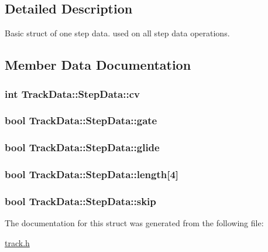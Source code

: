\subsection{Detailed Description}
Basic struct of one step data. used on all step data operations. 

\subsection{Member Data Documentation}
\hypertarget{structTrackData_1_1StepData_a67ecaedf95ce95b8a92ecf1990644214}{
\subsubsection[{cv}]{\setlength{\rightskip}{0pt plus 5cm}int Track\-Data\-::\-Step\-Data\-::cv}}\label{structTrackData_1_1StepData_a67ecaedf95ce95b8a92ecf1990644214}
\hypertarget{structTrackData_1_1StepData_a3d44ed4a2b85f2c8c73687b4c1c07b1d}{
\subsubsection[{gate}]{\setlength{\rightskip}{0pt plus 5cm}bool Track\-Data\-::\-Step\-Data\-::gate}}\label{structTrackData_1_1StepData_a3d44ed4a2b85f2c8c73687b4c1c07b1d}
\hypertarget{structTrackData_1_1StepData_a463a1c0acf02277e2fcb9019adf280d3}{
\subsubsection[{glide}]{\setlength{\rightskip}{0pt plus 5cm}bool Track\-Data\-::\-Step\-Data\-::glide}}\label{structTrackData_1_1StepData_a463a1c0acf02277e2fcb9019adf280d3}
\hypertarget{structTrackData_1_1StepData_a6a472e262e19bd2b2be75d3332481dec}{
\subsubsection[{length}]{\setlength{\rightskip}{0pt plus 5cm}bool Track\-Data\-::\-Step\-Data\-::length\mbox{[}4\mbox{]}}}\label{structTrackData_1_1StepData_a6a472e262e19bd2b2be75d3332481dec}
\hypertarget{structTrackData_1_1StepData_adf3912b411e7caa1e98cb2ad16d79fa0}{
\subsubsection[{skip}]{\setlength{\rightskip}{0pt plus 5cm}bool Track\-Data\-::\-Step\-Data\-::skip}}\label{structTrackData_1_1StepData_adf3912b411e7caa1e98cb2ad16d79fa0}


The documentation for this struct was generated from the following file\-:\begin{DoxyCompactItemize}
\item 
\hyperlink{track_8h}{track.\-h}\end{DoxyCompactItemize}
